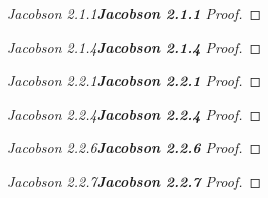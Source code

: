 \documentclass[12pt]{article}
\newenvironment{fproof}[1][]
  {\begin{proof}[\ifx\relax#1\relax\else\textbf{\large #1} Proof\fi]}
  {\end{proof}}
\begin{document}
\begin{fproof}[Jacobson 2.1.1] 
\end{fproof}

\newpage

\begin{fproof}[Jacobson 2.1.4]
\end{fproof}

\newpage

\begin{fproof}[Jacobson 2.2.1]
\end{fproof}

\newpage

\begin{fproof}[Jacobson 2.2.4]
\end{fproof}

\newpage

\begin{fproof}[Jacobson 2.2.6]
\end{fproof}

\newpage

\begin{fproof}[Jacobson 2.2.7]
\end{fproof}
\end{document}
